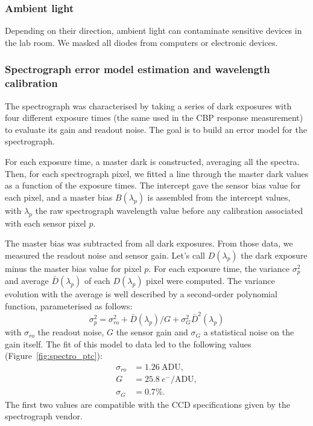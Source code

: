 \subsubsection{Ambient light}

Depending on their direction, ambient light can contaminate sensitive devices in the lab room. We masked all diodes from computers or electronic devices.

\subsubsection{Spectrograph error model estimation and wavelength calibration}

The spectrograph was characterised by taking a series of dark exposures with four different exposure times (the same used in the CBP response measurement) to evaluate its gain and readout noise. The goal is to build an error model for the spectrograph.

For each exposure time, a master dark is constructed, averaging all the spectra. Then, for each spectrograph pixel, we fitted a line through the master dark values as a function of the exposure times. The intercept gave the sensor bias value for each pixel, and a master bias $B(\lambda_p)$ is assembled from the intercept values, with $\lambda_p$ the raw spectrograph wavelength value before any calibration associated with each sensor pixel $p$. 

The master bias was subtracted from all dark exposures. From those data, we measured the readout noise and sensor gain. Let's call $D(\lambda_p)$ the dark exposure minus the master bias value for pixel $p$. For each exposure time, the variance $\sigma_p^2$ and average $\bar{D}(\lambda_p)$ of each $D(\lambda_p)$ pixel were computed. The variance evolution with the average is well described by a second-order polynomial function, parameterised as follows:
\begin{equation}\label{eq:spectro_error_model}
\sigma^2_p =\sigma_{ro}^2 +  \bar{D}(\lambda_p)/G + \sigma_G^2 \bar{D}^2(\lambda_p)
\end{equation}
with $\sigma_{ro}$ the readout noise, $G$ the sensor gain and $\sigma_G$ a statistical noise on the gain itself. The fit of this model to data led to the following values (Figure~\ref{fig:spectro_ptc}):
\begin{align}
    \sigma_{ro} &= 1.26\ \mathrm{ADU}, \\
    G & = 25.8\ e^-/\mathrm{ADU} ,\\
    \sigma_G & = 0.7\%.
\end{align}
The first two values are compatible with the CCD specifications given by the spectrograph vendor. 

